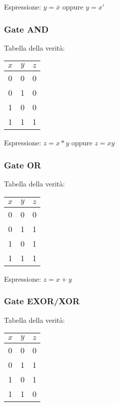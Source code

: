\documentclass{subfiles}
\begin{document}
\noindent
Espressione: $y = \overline{x}$ oppure $y = x'$

\subsubsection{Gate AND}

Tabella della verità:

\begin{center}
\begin{tabular}{ |c|c|c| }
\hline
$x$ & $y$ & $z$ \\
\hline
\hline
0 & 0 & 0 \\
0 & 1 & 0 \\
1 & 0 & 0 \\
1 & 1 & 1 \\
\hline
\end{tabular}
\end{center}

\noindent
Espressione: $z = x*y$ oppure $z = xy$

\subsubsection{Gate OR}

Tabella della verità:

\begin{center}
\begin{tabular}{ |c|c|c| }
\hline
$x$ & $y$ & $z$ \\
\hline
\hline
0 & 0 & 0 \\
0 & 1 & 1 \\
1 & 0 & 1 \\
1 & 1 & 1 \\
\hline
\end{tabular}
\end{center}

\noindent
Espressione: $z = x + y$

\subsubsection{Gate EXOR/XOR}

Tabella della verità:

\begin{center}
\begin{tabular}{ |c|c|c| }
\hline
$x$ & $y$ & $z$ \\
\hline
\hline
0 & 0 & 0 \\
0 & 1 & 1 \\
1 & 0 & 1 \\
1 & 1 & 0 \\
\hline
\end{tabular}
\end{center}
\end{document}
